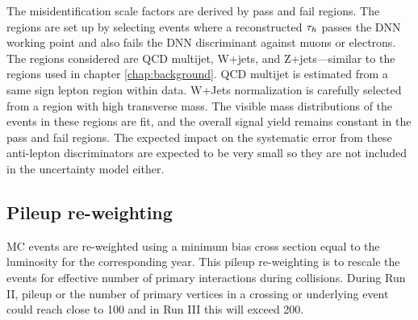 The misidentification scale factors are derived by pass and fail regions. The regions are set up by selecting events where a reconstructed $\tau_h$ passes the DNN working point and also fails the DNN discriminant against muons or electrons. The regions considered are QCD multijet, W+jets, and Z+jets---similar to the regions used in chapter \ref{chap:background}. QCD multijet is estimated from a same sign lepton region within data. W+Jets normalization is carefully selected from a region with high transverse mass. The visible mass distributions of the events in these regions are fit, and the overall signal yield remains constant in the pass and fail regions. 
The expected impact on the systematic error from these anti-lepton discriminators are expected to be very small so they are not included in the uncertainty model either.



\subsection{Pileup re-weighting}

MC events are re-weighted using a minimum bias cross section equal to the luminosity for the corresponding year. This pileup re-weighting is to rescale the events for effective number of primary interactions during collisions. During Run II, pileup or the number of primary vertices in a crossing or underlying event could reach close to 100 and in Run III this will exceed 200.   

